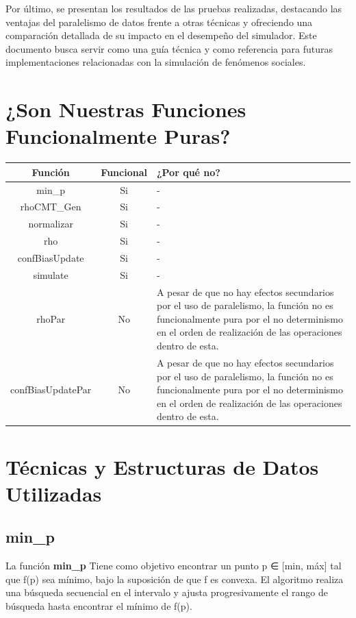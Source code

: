 \documentclass{article}
\begin{document}
Por último, se presentan los resultados de las pruebas realizadas, destacando las ventajas del paralelismo de datos frente a otras técnicas y ofreciendo una comparación detallada de su impacto en el desempeño del simulador. Este documento busca servir como una guía técnica y como referencia para futuras implementaciones relacionadas con la simulación de fenómenos sociales.


  \section{¿Son Nuestras Funciones Funcionalmente Puras?}

  \begin{table}[H]
    \centering
    \begin{tabular}{|c|c|p{5cm}|}
    \hline
    \textbf{Función} & \textbf{Funcional} & \textbf{¿Por qué no?} \\ \hline
    min\_p & Si & - \\ \hline
    rhoCMT\_Gen & Si & - \\ \hline
    normalizar & Si & - \\ \hline
    rho & Si & - \\ \hline
    confBiasUpdate & Si & - \\ \hline
    simulate & Si & - \\ \hline
    rhoPar & No & A pesar de que no hay efectos secundarios por el uso de paralelismo, la función no es funcionalmente pura por el no determinismo en el orden de realización de las operaciones dentro de esta. \\ \hline
    confBiasUpdatePar & No & A pesar de que no hay efectos secundarios por el uso de paralelismo, la función no es funcionalmente pura por el no determinismo en el orden de realización de las operaciones dentro de esta. \\ \hline
    \end{tabular}
  \end{table}

  \section{Técnicas y Estructuras de Datos Utilizadas}
    
    \subsection{min\_p}
    La función \textbf{min\_p} Tiene como objetivo encontrar un punto p ∈ [min, máx] tal que f(p) sea mínimo, bajo la suposición de que f es convexa. El algoritmo realiza una búsqueda secuencial en el intervalo y ajusta progresivamente el rango de búsqueda hasta encontrar el mínimo de f(p).
\end{document}

